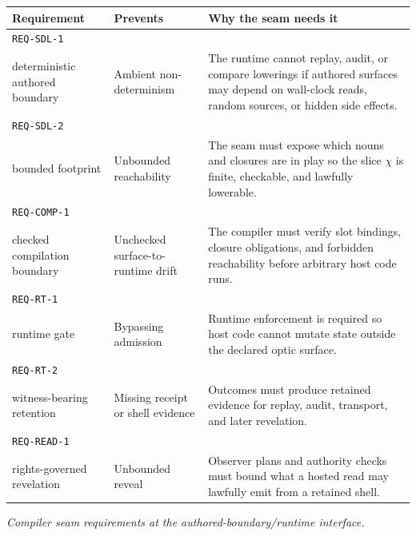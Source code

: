 \documentclass{aion}
\begin{document}
\begin{center}
	\small
	\setlength{\tabcolsep}{5pt}
	\renewcommand{\arraystretch}{1.18}
	\AIONTableStyleOn
	\begin{tabularx}{\textwidth}{@{}>{\raggedright\arraybackslash}p{}>{\raggedright\arraybackslash}p{}X@{}}
		\toprule
		\AIONTableHead
		Requirement & Prevents & Why the seam needs it \\
		\midrule
		\texttt{REQ-SDL-1}\\deterministic authored boundary
		& Ambient non-determinism
		& The runtime cannot replay, audit, or compare lowerings if authored surfaces may depend on wall-clock reads, random sources, or hidden side effects. \\
		\texttt{REQ-SDL-2}\\bounded footprint
		& Unbounded reachability
		& The seam must expose which nouns and closures are in play so the slice \(\chi\) is finite, checkable, and lawfully lowerable. \\
		\texttt{REQ-COMP-1}\\checked compilation boundary
		& Unchecked surface-to-runtime drift
		& The compiler must verify slot bindings, closure obligations, and forbidden reachability before arbitrary host code runs. \\
		\texttt{REQ-RT-1}\\runtime gate
		& Bypassing admission
		& Runtime enforcement is required so host code cannot mutate state outside the declared optic surface. \\
		\texttt{REQ-RT-2}\\witness-bearing retention
		& Missing receipt or shell evidence
		& Outcomes must produce retained evidence for replay, audit, transport, and later revelation. \\
		\texttt{REQ-READ-1}\\rights-governed revelation
		& Unbounded reveal
		& Observer plans and authority checks must bound what a hosted read may lawfully emit from a retained shell. \\
		\bottomrule
	\end{tabularx}
	\AIONTableStyleOff

	\smallskip
	\small\emph{Compiler seam requirements at the authored-boundary/runtime interface.}
\end{center}
\end{document}
